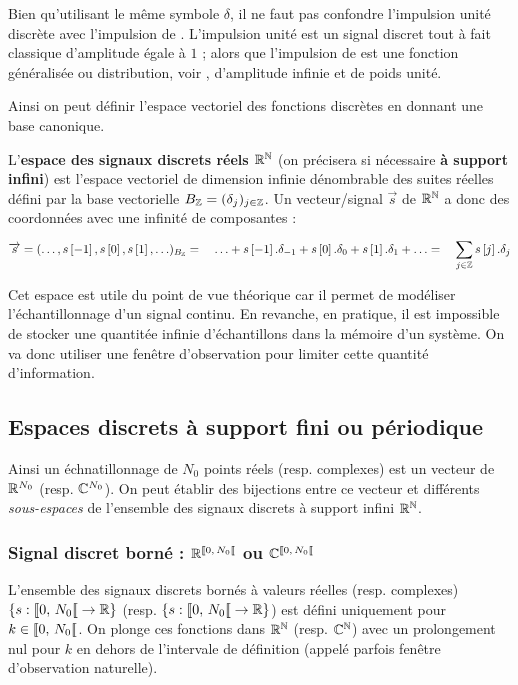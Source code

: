 \begin{remarque}
  Bien qu'utilisant le même symbole $\delta$, il ne faut pas confondre
l'impulsion unité discrète avec l'impulsion de \Dirac. L'impulsion
unité est un signal discret tout à fait classique d'amplitude égale à
$1$ ; alors que l'impulsion de \Dirac{} est une fonction généralisée ou
distribution, voir , d'amplitude infinie et de
poids unité.
\end{remarque}

Ainsi on peut définir l'espace vectoriel des fonctions discrètes en
donnant une base canonique.

\begin{definition}
  \label{def:signal_discret}
  L'\textbf{espace des signaux discrets réels $\mathbb{R}^{\mathbb{N}}$} (on précisera si
  nécessaire \textbf{à support infini}) est l'espace vectoriel de
  dimension infinie dénombrable des suites réelles défini par la base
  vectorielle $B_{\mathbb{Z}}=(\delta_j)_{j\in\mathbb{Z}}$. Un vecteur/signal
  $\vec{s}$ de $\mathbb{R}^{\mathbb{N}}$ a donc des coordonnées avec une infinité de
  composantes :
  \begin{equation}
    \overrightarrow{s}  = (\ldots,s\left[-1\right], s\left[0\right], s\left[1\right], \ldots)_{B_{\mathbb{Z}}} = \quad \ldots + s\left[-1\right].\delta_{-1} + s\left[0\right].\delta_0 + s\left[1\right].\delta_1 + \ldots =\quad \sum\limits_{j\in\mathbb{Z}}^{}{s\left[j\right].\delta_j}
  \end{equation}
\end{definition}

Cet espace est utile du point de vue théorique car il permet de
modéliser l'échantillonnage d'un signal continu. En revanche, en
pratique, il est impossible de stocker une quantitée infinie
d'échantillons dans la mémoire d'un système. On va donc utiliser une
fenêtre d'observation pour limiter cette quantité d'information.


\subsection{Espaces discrets à support fini ou périodique}
Ainsi un échnatillonnage de $N_0$ points réels (resp. complexes) est
un vecteur de $\mathbb{R}^{N_0}$ (resp. $\mathbb{C}^{N_0}$). On peut établir des bijections
entre ce vecteur et différents \emph{sous-espaces} de l'ensemble des signaux
discrets à support infini $\mathbb{R}^{\mathbb{N}}$.



\subsubsection{Signal discret borné :  $\RNborne$ ou $\CNborne$}
L'ensemble des signaux discrets bornés à valeurs réelles (resp. complexes) $\left\{s : \SN0 \to \R \right\}$ (resp. $\left\{s : \SN0 \to \R \right\}$) est défini uniquement pour $k\in\SN0$. On plonge ces fonctions dans $\mathbb{R}^{\mathbb{N}}$ (resp. $\mathbb{C}^{\mathbb{N}}$) avec un prolongement nul pour $k$ en dehors de l'intervale de définition (appelé parfois fenêtre d'observation naturelle).

